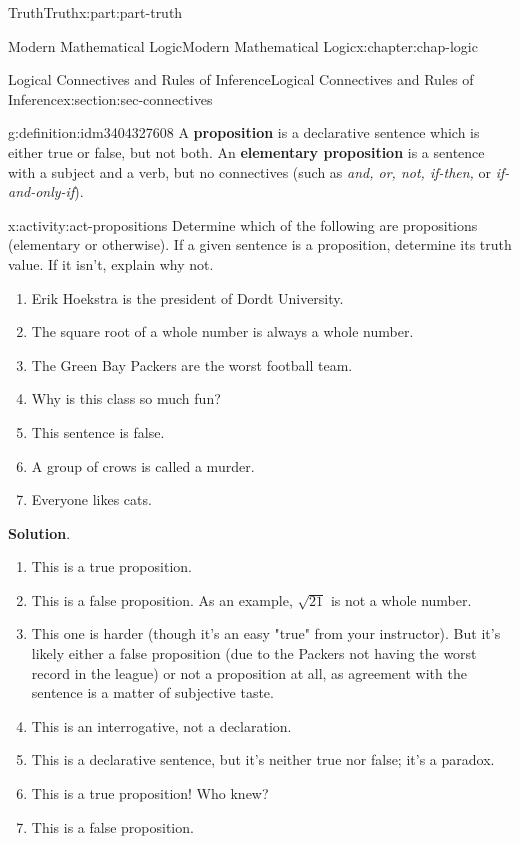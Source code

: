 \documentclass[oneside,10pt,]{book}
\newcommand{\blocktitlefont}{\relax}
\newcommand{\terminology}[1]{\textbf{#1}}
\numberwithin{equation}{section}
\begin{document}
\begin{partptx}{Truth}{}{Truth}{}{}{x:part:part-truth}
\begin{chapterptx}{Modern Mathematical Logic}{}{Modern Mathematical Logic}{}{}{x:chapter:chap-logic}
\begin{sectionptx}{Logical Connectives and Rules of Inference}{}{Logical Connectives and Rules of Inference}{}{}{x:section:sec-connectives}
\begin{definition}{}{g:definition:idm3404327608}
%
%
%
A \terminology{proposition} is a declarative sentence which is either true or false, but not both. An \terminology{elementary proposition} is a sentence with a subject and a verb, but no connectives (such as \emph{and, or, not, if-then,} or \emph{if-and-only-if}).%
\end{definition}
\begin{activity}{}{x:activity:act-propositions}%
Determine which of the following are propositions (elementary or otherwise). If a given sentence is a proposition, determine its truth value. If it isn't, explain why not.%
%
\begin{enumerate}
\item{}Erik Hoekstra is the president of Dordt University.%
\item{}The square root of a whole number is always a whole number.%
\item{}The Green Bay Packers are the worst football team.%
\item{}Why is this class so much fun?%
\item{}This sentence is false.%
\item{}A group of crows is called a murder.%
\item{}Everyone likes cats.%
\end{enumerate}
\par\smallskip%
\noindent\textbf{\blocktitlefont Solution}.\hypertarget{g:solution:idm3404321192}{}\quad{}%
\begin{enumerate}
\item{}This is a true proposition.%
\item{}This is a false proposition. As an example, \(\sqrt{21}\) is not a whole number.%
\item{}This one is harder (though it's an easy "true" from your instructor). But it's likely either a false proposition (due to the Packers not having the worst record in the league) or not a proposition at all, as agreement with the sentence is a matter of subjective taste.%
\item{}This is an interrogative, not a declaration.%
\item{}This is a declarative sentence, but it's neither true nor false; it's a paradox.%
\item{}This is a true proposition! Who knew?%
\item{}This is a false proposition.%
\end{enumerate}
\end{activity}%

\end{sectionptx}
\end{chapterptx}
\end{partptx}
\end{document}
